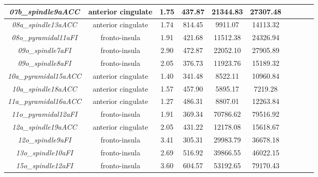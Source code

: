 \begin{longtable}{|c|c|c|c|c|c|c|c|c|c|}
	\textit{07b\_spindle9aACC}    & anterior cingulate & 1.75                      & 437.87                    & 21344.83                  & 27307.48                  \\ \hline
	\textit{08a\_spindle13aACC}   & anterior cingulate & 1.74                      & 814.45                    & 9911.07                   & 14113.32                  \\ \hline
	\textit{08o\_pyramidal11aFI}  & fronto-insula      & 1.91                      & 421.68                    & 11512.38                  & 24326.94                  \\ \hline
	\textit{09o\_spindle7aFI}     & fronto-insula      & 2.90                      & 472.87                    & 22052.10                  & 27905.89                  \\ \hline
	\textit{09o\_spindle8aFI}     & fronto-insula      & 2.05                      & 376.73                    & 11923.76                  & 15189.32                  \\ \hline
	\textit{10a\_pyramidal15aACC} & anterior cingulate & 1.40                      & 341.48                    & 8522.11                   & 10960.84                  \\ \hline
	\textit{10a\_spindle18aACC}   & anterior cingulate & 1.57                      & 457.90                    & 5895.17                   & 7219.28                   \\ \hline
	\textit{11a\_pyramidal16aACC} & anterior cingulate & 1.27                      & 486.31                    & 8807.01                   & 12263.84                  \\ \hline
	\textit{11o\_pyramidal12aFI}  & fronto-insula      & 1.91                      & 369.34                    & 70786.62                  & 79516.92                  \\ \hline
	\textit{12a\_spindle19aACC}   & anterior cingulate & 2.05                      & 431.22                    & 12178.08                  & 15618.67                  \\ \hline
	\textit{12o\_spindle9aFI}     & fronto-insula      & 3.41                      & 305.31                    & 29983.79                  & 36678.18                  \\ \hline
	\textit{13o\_spindle10aFI}    & fronto-insula      & 2.69                      & 516.92                    & 39866.55                  & 46022.15                  \\ \hline
	\textit{15o\_spindle12aFI}    & fronto-insula      & 3.60                      & 604.57                    & 53192.65                  & 79170.43                  \\ \hline

\end{longtable}
